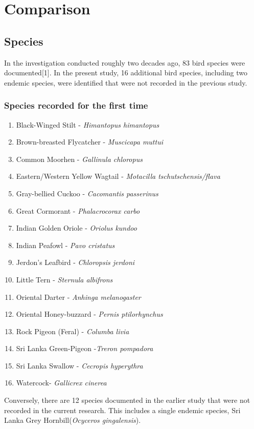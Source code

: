 \chapter{Comparison}
\label{cp:Comparative}
\section{Species}
In the investigation conducted roughly two decades ago, 83 bird species were documented[1]. In the present study, 16 additional bird species, including two endemic species, were identified that were not recorded in the previous study.

\begin{importantbox}
\subsection{Species recorded for the first time}
\begin{enumerate}
    \item Black-Winged Stilt - \textit{Himantopus himantopus}
    \item Brown-breasted Flycatcher - \textit{Muscicapa muttui}
    \item Common Moorhen - \textit{Gallinula chloropus}
    \item Eastern/Western Yellow Wagtail - \textit{Motacilla tschutschensis/flava}
    \item Gray-bellied Cuckoo - \textit{Cacomantis passerinus}
    \item Great Cormorant - \textit{Phalacrocorax carbo}
    \item Indian Golden Oriole - \textit{Oriolus kundoo}
    \item Indian Peafowl - \textit{Pavo cristatus}
    \item Jerdon's Leafbird - \textit{Chloropsis jerdoni}
    \item Little Tern - \textit{Sternula albifrons}
    \item Oriental Darter - \textit{Anhinga melanogaster}
    \item Oriental Honey-buzzard - \textit{Pernis ptilorhynchus}
    \item Rock Pigeon (Feral) - \textit{Columba livia}
    \item Sri Lanka Green-Pigeon -\textit{Treron pompadora}
    \item Sri Lanka Swallow - \textit{Cecropis hyperythra}
    \item Watercock- \textit{Gallicrex cinerea}
\end{enumerate}
\end{importantbox}

Conversely, there are 12 species documented in the earlier study that were not recorded in the current research. This includes a single endemic species, Sri Lanka Grey Hornbill(\textit{Ocyceros gingalensis}).
